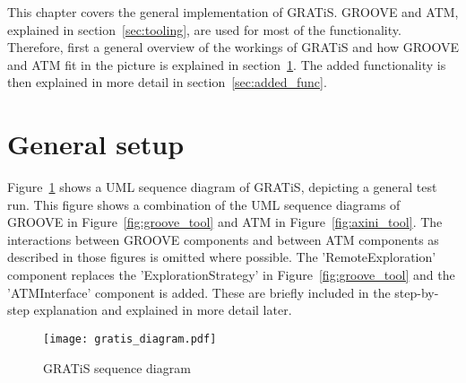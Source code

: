This chapter covers the general implementation of GRATiS. GROOVE and ATM, explained in section~\ref{sec:tooling}, are used for most of the functionality. Therefore, first a general overview of the workings of GRATiS and how GROOVE and ATM fit in the picture is explained in section~\ref{sec:general-setup}. The added functionality is then explained in more detail in section~\ref{sec:added_func}.

\section{General setup}\label{sec:general-setup}
Figure~\ref{fig:tooling} shows a UML sequence diagram of GRATiS, depicting a general test run. This figure shows a combination of the UML sequence diagrams of GROOVE in Figure~\ref{fig:groove_tool} and ATM in Figure~\ref{fig:axini_tool}. The interactions between GROOVE components and between ATM components as described in those figures is omitted where possible. The 'RemoteExploration' component replaces the 'ExplorationStrategy' in Figure~\ref{fig:groove_tool} and the 'ATMInterface' component is added. These are briefly included in the step-by-step explanation and explained in more detail later.

\begin{figure}[ht]
  \begin{center}
    \texttt{[image: gratis\_diagram.pdf]}
  \end{center}
  \caption{GRATiS sequence diagram}
  \label{fig:tooling}
\end{figure}

